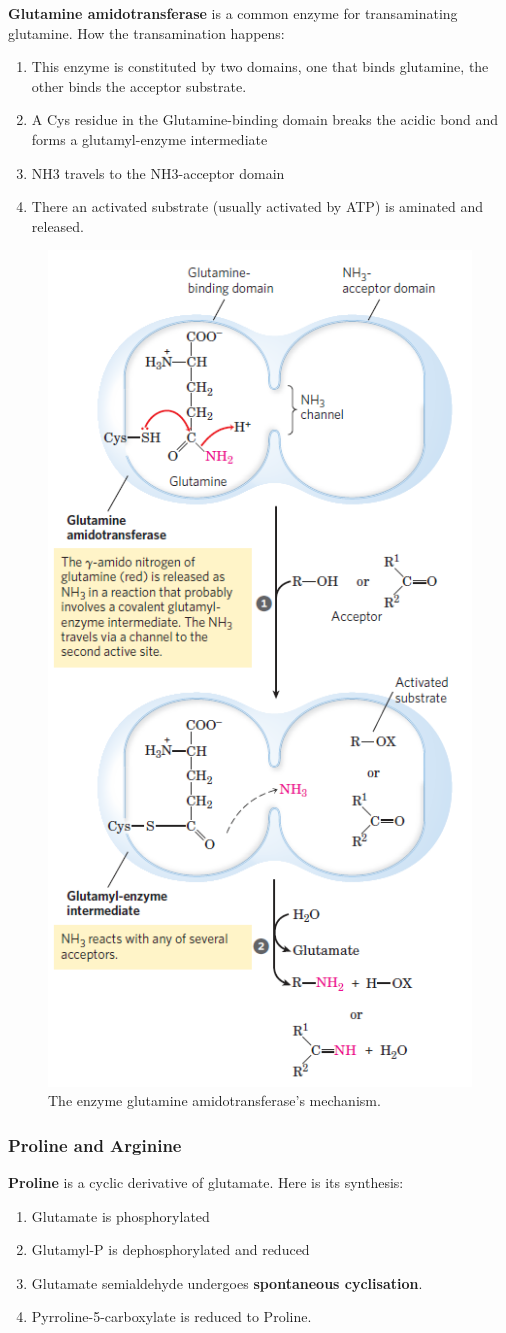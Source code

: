 \documentclass[../main.tex]{subfiles}
\begin{document}
\textbf{\gls{Glutamine amidotransferase}} is a common enzyme for transaminating glutamine. How the transamination happens:
\begin{enumerate}
	\item This enzyme is constituted by two domains, one that binds glutamine, the other binds the acceptor substrate.
	\item A Cys residue in the Glutamine-binding domain breaks the acidic bond and forms a glutamyl-enzyme intermediate
	\item NH3 travels to the NH3-acceptor domain
	\item There an activated substrate (usually activated by ATP) is aminated and released.
\end{enumerate}
\begin{figure}[H]
	\centering
	\includegraphics[width=0.5\linewidth]{nit_enz}
	\caption{The enzyme glutamine amidotransferase's mechanism.}
	\label{fig:nitenz}
\end{figure}


\subsubsection{Proline and Arginine}

\textbf{\gls{Proline}} is a cyclic derivative of glutamate. Here is its synthesis:
\begin{enumerate}
	\item Glutamate is phosphorylated
	\item Glutamyl-P is dephosphorylated and reduced
	\item Glutamate semialdehyde undergoes \textbf{spontaneous cyclisation}.
	\item Pyrroline-5-carboxylate is reduced to Proline.
\end{enumerate}
\end{document}
